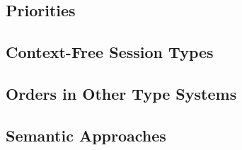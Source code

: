 \subsection{Priorities}
\label{sec:rw-priorities}

\subsection{Context-Free Session Types}
\label{sec:rw-cfst}

\subsection{Orders in Other Type Systems}
\label{sec:rw-orders}

\subsection{Semantic Approaches}
\label{sec:rw-semantic}

